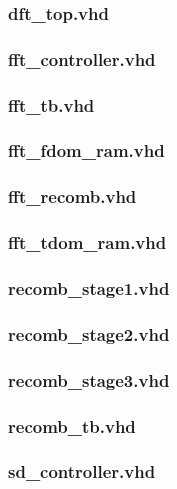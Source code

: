 \documentclass{article}
\begin{document}
	\subsubsection{dft\_top.vhd}
	
	\subsubsection{fft\_controller.vhd}
	
	\subsubsection{fft\_tb.vhd}
	
	\subsubsection{fft\_fdom\_ram.vhd}
	
	\subsubsection{fft\_recomb.vhd}
	
	\subsubsection{fft\_tdom\_ram.vhd}
	
	\subsubsection{recomb\_stage1.vhd}
	
	\subsubsection{recomb\_stage2.vhd}
	
	\subsubsection{recomb\_stage3.vhd}
	
	\subsubsection{recomb\_tb.vhd}
	
	\subsubsection{sd\_controller.vhd}
	
\end{document}
